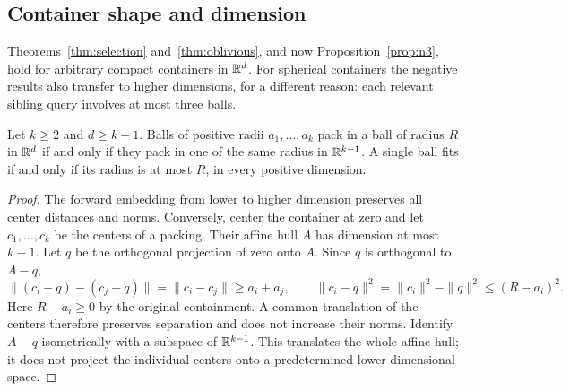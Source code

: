 \subsection{Container shape and dimension}\label{sec:dimension}

Theorems~\ref{thm:selection} and~\ref{thm:oblivious}, and now
Proposition~\ref{prop:n3}, hold for arbitrary compact containers in
$\mathbb{R}^d$. For spherical containers the negative results also transfer
to higher dimensions, for a different reason: each relevant sibling
query involves at most three balls.

\begin{lemma}\label{lem:dimreduce}
Let $k\ge2$ and $d\ge k-1$. Balls of positive radii $a_1,\ldots,a_k$
pack in a ball of radius $R$ in $\mathbb{R}^d$ if and only if they pack in
one of the same radius in $\mathbb{R}^{k-1}$. A single ball fits if and only
if its radius is at most $R$, in every positive dimension.
\end{lemma}
\begin{proof}
The forward embedding from lower to higher dimension preserves all
center distances and norms. Conversely, center the container at zero
and let $c_1,\ldots,c_k$ be the centers of a packing. Their affine hull
$A$ has dimension at most $k-1$. Let $q$ be the orthogonal projection
of zero onto $A$. Since $q$ is orthogonal to $A-q$,
\[
 \|(c_i-q)-(c_j-q)\|=\|c_i-c_j\|\ge a_i+a_j,
 \qquad \|c_i-q\|^2=\|c_i\|^2-\|q\|^2\le(R-a_i)^2.
\]
Here $R-a_i\ge0$ by the original containment. A common translation
of the centers therefore preserves separation and does not increase
their norms. Identify $A-q$ isometrically with a subspace of
$\mathbb{R}^{k-1}$. This translates the whole affine hull; it does not project
the individual centers onto a predetermined lower-dimensional space.
\end{proof}

